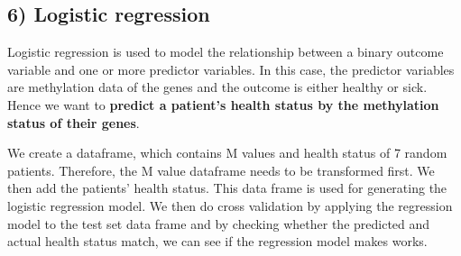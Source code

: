 \documentclass[]{article}
\newenvironment{Shaded}{\begin{snugshade}}{\end{snugshade}}
\newcommand{\KeywordTok}[1]{\textcolor[rgb]{0.13,0.29,0.53}{\textbf{#1}}}
\newcommand{\DataTypeTok}[1]{\textcolor[rgb]{0.13,0.29,0.53}{#1}}
\newcommand{\DecValTok}[1]{\textcolor[rgb]{0.00,0.00,0.81}{#1}}
\newcommand{\StringTok}[1]{\textcolor[rgb]{0.31,0.60,0.02}{#1}}
\newcommand{\OperatorTok}[1]{\textcolor[rgb]{0.81,0.36,0.00}{\textbf{#1}}}
\newcommand{\NormalTok}[1]{#1}
\begin{document}
\subsection{6) Logistic regression}\label{logistic-regression}

Logistic regression is used to model the relationship between a binary
outcome variable and one or more predictor variables. In this case, the
predictor variables are methylation data of the genes and the outcome is
either healthy or sick. Hence we want to \textbf{predict a patient's
health status by the methylation status of their genes}.

We create a dataframe, which contains M values and health status of 7
random patients. Therefore, the M value dataframe needs to be
transformed first. We then add the patients' health status. This data
frame is used for generating the logistic regression model. We then do
cross validation by applying the regression model to the test set data
frame and by checking whether the predicted and actual health status
match, we can see if the regression model makes works.

\begin{Shaded}
\end{Shaded}
\end{document}
